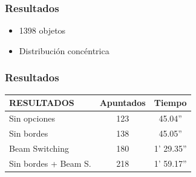 \begin{frame}
    \frametitle{Resultados}
    \begin{itemize}
    \item 1398 objetos
    \item Distribución concéntrica
    \end{itemize}
    \endblock{}
		\begin{center}
		\end{center}
\end{frame}

\begin{frame}
    \frametitle{Resultados}
    {\ttfamily
\begin{tabular}{||l||c|c||}
\hline
\hline
RESULTADOS & Apuntados & Tiempo \\
\hline
\hline
Sin opciones & 123 & 45.04'' \\
\hline
Sin bordes &138 & 45.05'' \\
\hline
Beam Switching & 180 & 1' 29.35'' \\
\hline
Sin bordes + Beam S. & 218 & 1' 59.17'' \\
\hline
\hline
\end{tabular}}
    \endblock{}
\end{frame}

